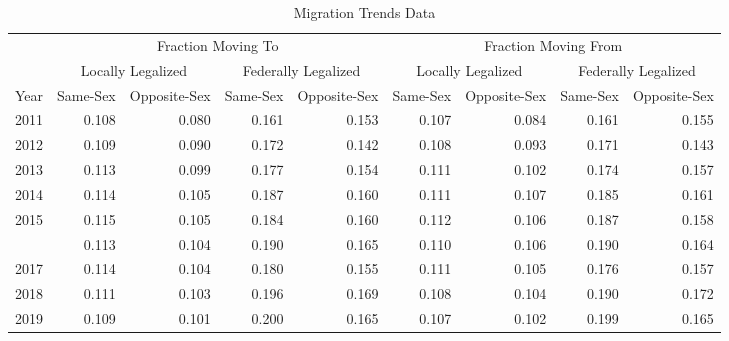 \begin{table}

\caption{Migration Trends Data}
\centering
\begin{tabular}[t]{rrrrrrrrr}
\toprule
\multicolumn{1}{c}{ } & \multicolumn{4}{c}{Fraction Moving To} & \multicolumn{4}{c}{Fraction Moving From} \\
\cmidrule(l{3pt}r{3pt}){2-5} \cmidrule(l{3pt}r{3pt}){6-9}
\multicolumn{1}{c}{ } & \multicolumn{2}{c}{Locally Legalized} & \multicolumn{2}{c}{Federally Legalized} & \multicolumn{2}{c}{Locally Legalized} & \multicolumn{2}{c}{Federally Legalized} \\
\cmidrule(l{3pt}r{3pt}){2-3} \cmidrule(l{3pt}r{3pt}){4-5} \cmidrule(l{3pt}r{3pt}){6-7} \cmidrule(l{3pt}r{3pt}){8-9}
Year & Same-Sex & Opposite-Sex & Same-Sex & Opposite-Sex & Same-Sex & Opposite-Sex & Same-Sex & Opposite-Sex\\
\midrule
2011 & 0.108 & 0.080 & 0.161 & 0.153 & 0.107 & 0.084 & 0.161 & 0.155\\
2012 & 0.109 & 0.090 & 0.172 & 0.142 & 0.108 & 0.093 & 0.171 & 0.143\\
2013 & 0.113 & 0.099 & 0.177 & 0.154 & 0.111 & 0.102 & 0.174 & 0.157\\
2014 & 0.114 & 0.105 & 0.187 & 0.160 & 0.111 & 0.107 & 0.185 & 0.161\\
2015 & 0.115 & 0.105 & 0.184 & 0.160 & 0.112 & 0.106 & 0.187 & 0.158\\
\addlinespace
2016 & 0.113 & 0.104 & 0.190 & 0.165 & 0.110 & 0.106 & 0.190 & 0.164\\
2017 & 0.114 & 0.104 & 0.180 & 0.155 & 0.111 & 0.105 & 0.176 & 0.157\\
2018 & 0.111 & 0.103 & 0.196 & 0.169 & 0.108 & 0.104 & 0.190 & 0.172\\
2019 & 0.109 & 0.101 & 0.200 & 0.165 & 0.107 & 0.102 & 0.199 & 0.165\\
\bottomrule
\end{tabular}
\end{table}
